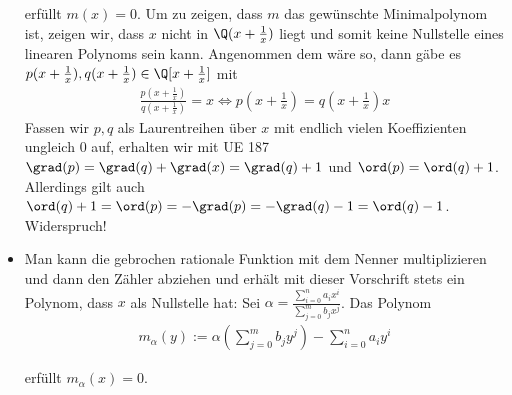 \begin{solution}
\begin{itemize}
  erfüllt $m(x) = 0$. Um zu zeigen, dass $m$ das gewünschte Minimalpolynom ist,
  zeigen wir, dass $x$ nicht in $\Q(x + \frac{1}{x})$ liegt und somit keine
  Nullstelle eines linearen Polynoms sein kann. Angenommen dem wäre so, dann gäbe
  es $p(x+\frac{1}{x}),q(x+\frac{1}{x}) \in \Q[x+\frac{1}{x}]$ mit
  \begin{align*}
    \frac{p(x+\frac{1}{x})}{q(x+\frac{1}{x})} = x \iff p(x+\frac{1}{x}) = q(x + \frac{1}{x})x
  \end{align*}
  Fassen wir $p,q$ als Laurentreihen über $x$ mit endlich vielen Koeffizienten ungleich $0$
  auf, erhalten wir mit UE 187 $\grad(p) = \grad(q) + \grad(x) = \grad(q) + 1$ und
  $\ord(p) = \ord(q) + 1$. Allerdings gilt auch $\ord(q) + 1 = \ord(p) = -\grad(p) = -\grad(q) - 1 = \ord(q) - 1$.
  Widerspruch!
  \item Man kann die gebrochen rationale Funktion mit dem Nenner multiplizieren
  und dann den Zähler abziehen und erhält mit dieser Vorschrift stets ein Polynom,
  dass $x$ als Nullstelle hat:
  Sei $\alpha = \frac{\sum_{i=0}^n a_i x^i}{\sum_{j=0}^m b_j x^j}$. Das Polynom
  \begin{align}
  m_\alpha(y) := \alpha \left(\sum_{j=0}^m b_j y^j\right) - \sum_{i=0}^n a_i y^i
  \end{align}

  erfüllt $m_\alpha(x) = 0.$
\end{itemize}



\end{solution}
